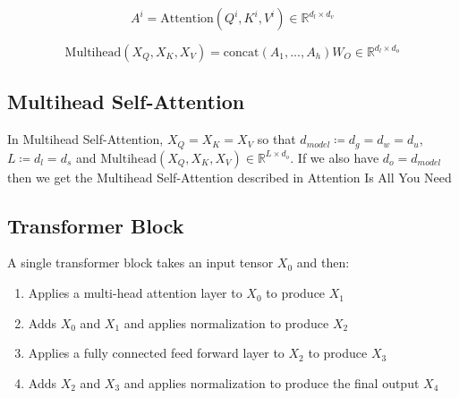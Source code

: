 \documentclass[11pt]{article}
\theoremstyle{definition}
\begin{document}
\begin{equation}
A^i = \mathrm{Attention} \left(Q^i,K^i,V^i \right) \in \mathbb{R}^{d_l \times d_v}
\end{equation}

\begin{equation}
\mathrm{Multihead}\left(X_Q, X_K, X_V \right) =
\mathrm{concat} \left( A_1, ... , A_h \right)W_O
\in \mathbb{R}^{d_l \times d_o}
\end{equation}

\subsection{Multihead Self-Attention}

In Multihead Self-Attention, $X_Q = X_K = X_V$ so that $d_{model} \coloneqq d_g = d_w = d_u$, $L \coloneqq d_l = d_s$ and $\mathrm{Multihead}\left(X_Q, X_K, X_V \right) \in \mathbb{R}^{L \times d_o}$. If we also have $d_o = d_{model}$ then we get the Multihead Self-Attention described in \cite{vaswani2017attention}{Attention Is All You Need}

\subsection{Transformer Block}

A single transformer block takes an input tensor $X_0$ and then:
\begin{enumerate}
\item Applies a multi-head attention layer to $X_0$ to produce $X_1$
\item Adds $X_0$ and $X_1$ and applies normalization to produce $X_2$
\item Applies a fully connected feed forward layer to $X_2$ to produce $X_3$
\item Adds $X_2$ and $X_3$ and applies normalization to produce the final output $X_4$
\end{enumerate}
\end{document}
